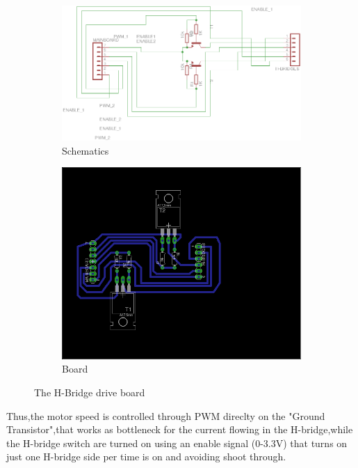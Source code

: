 \begin{figure}[!ht]
	\begin{subfigure}{.49\textwidth}
		\centering
		\includegraphics[width=1\textwidth]{figures/drive}
		\caption{Schematics}
		\label{fig:driveSCH}
	\end{subfigure}
	\begin{subfigure}{.49\textwidth}
		\centering
		\includegraphics[width=1\textwidth]{figures/drivebrd}
		\caption{Board}
		\label{fig:driveBRD}
	\end{subfigure}
\caption{The H-Bridge drive board}
\label{fig:driveH}
\end{figure}

Thus,the motor speed is controlled through PWM direclty on the "Ground Transistor",that works as bottleneck for the current flowing in the H-bridge,while the H-bridge switch are turned on using an enable signal (0-3.3V) that turns on just one H-bridge side per time is on and avoiding shoot through. \newpage

